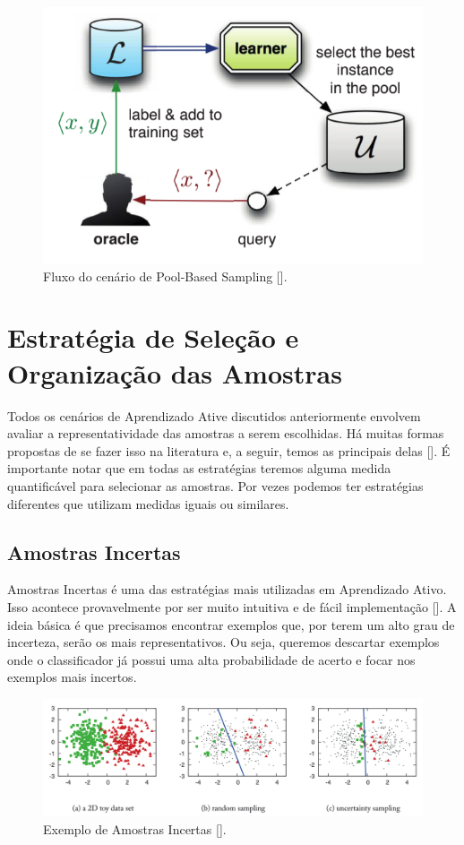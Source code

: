 \begin{figure}
  \centering
  \includegraphics[width=.5\textwidth]{figures/settles_2014_pool.png}
  \caption{Fluxo do cenário de Pool-Based Sampling [\cite{settles2014active}].}
  \label{fig:settles_2014_pool}
\end{figure}




\section{Estratégia de Seleção e Organização das Amostras}
\label{sec:query_strategy}

Todos os cenários de Aprendizado Ative discutidos anteriormente envolvem avaliar a representatividade das amostras a serem escolhidas. Há muitas formas propostas de se fazer isso na literatura e, a seguir, temos as principais delas [\cite{settles2012active}]. É importante notar que em todas as estratégias teremos alguma medida quantificável para selecionar as amostras. Por vezes podemos ter estratégias diferentes que utilizam medidas iguais ou similares.




\subsection{Amostras Incertas} %
\label{sec:amostras_incertas}

Amostras Incertas é uma das estratégias mais utilizadas em Aprendizado Ativo. Isso acontece provavelmente por ser muito intuitiva e de fácil implementação [\cite{settles2014active}]. A ideia básica é que precisamos encontrar exemplos que, por terem um alto grau de incerteza, serão os mais representativos. Ou seja, queremos descartar exemplos onde o classificador já possui uma alta probabilidade de acerto e focar nos exemplos mais incertos.  


\begin{figure}
  \centering
  \includegraphics[width=1.0\textwidth]{figures/settles_2014_uncertainty_sampling_example.png}
  \caption{Exemplo de Amostras Incertas [\cite{settles2014active}].}
  \label{fig:settles_2014_uncertainty_example}
\end{figure}

